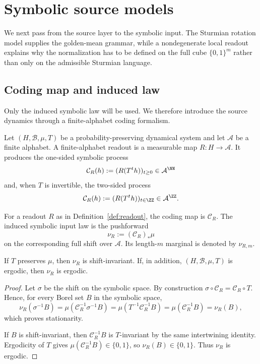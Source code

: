 \section{Symbolic source models}\label{sec:readout}

We next pass from the source layer to the symbolic input. The Sturmian rotation model supplies the golden-mean grammar, while a nondegenerate local readout explains why the normalization has to be defined on the full cube $\{0,1\}^m$ rather than only on the admissible Sturmian language.

\subsection{Coding map and induced law}\label{sec:readout:maps}

Only the induced symbolic law will be used. We therefore introduce the source dynamics through a finite-alphabet coding formalism.

\begin{definition}\label{def:readout}
Let $(H,\mathcal B,\mu,T)$ be a probability-preserving dynamical system and let
$\mathcal A$ be a finite alphabet.  A finite-alphabet readout is a measurable
map $R:H\to\mathcal A$.  It produces the one-sided symbolic process
\[
  \mathcal C_R(h):=(R(T^t h))_{t\ge0}\in\mathcal A^{\NN}
\]
and, when $T$ is invertible, the two-sided process
\[
  \mathcal C_R(h):=(R(T^t h))_{t\in\ZZ}\in\mathcal A^{\ZZ}.
\]
\end{definition}

\begin{definition}\label{def:coding-law}
For a readout $R$ as in Definition~\ref{def:readout}, the coding map is
$\mathcal C_R$.  The induced symbolic input law is the pushforward
\[
  \nu_R:=(\mathcal C_R)_*\mu
\]
on the corresponding full shift over $\mathcal A$.  Its length-$m$ marginal is
denoted by $\nu_{R,m}$.
\end{definition}

\begin{proposition}\label{prop:induced-law}
If $T$ preserves $\mu$, then $\nu_R$ is shift-invariant.  If, in addition,
$(H,\mathcal B,\mu,T)$ is ergodic, then $\nu_R$ is ergodic.
\end{proposition}

\begin{proof}
Let $\sigma$ be the shift on the symbolic space.  By construction
$\sigma\circ\mathcal C_R=\mathcal C_R\circ T$.  Hence, for every Borel set
$B$ in the symbolic space,
\[
\nu_R(\sigma^{-1}B)
=\mu(\mathcal C_R^{-1}\sigma^{-1}B)
=\mu(T^{-1}\mathcal C_R^{-1}B)
=\mu(\mathcal C_R^{-1}B)
=\nu_R(B),
\]
which proves stationarity.

If $B$ is shift-invariant, then $\mathcal C_R^{-1}B$ is $T$-invariant by the
same intertwining identity.  Ergodicity of $T$ gives
$\mu(\mathcal C_R^{-1}B)\in\{0,1\}$, so $\nu_R(B)\in\{0,1\}$.  Thus $\nu_R$
is ergodic.
\end{proof}

